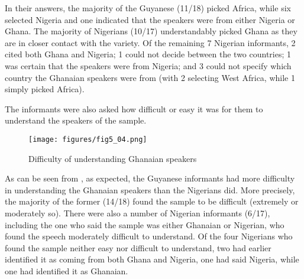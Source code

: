 \documentclass[output=paper,colorlinks,citecolor=brown]{langscibook}
\begin{document}
In their answers, the majority of the Guyanese (11/18) picked Africa, while six selected Nigeria and one indicated that the speakers were from either Nigeria or Ghana. The majority of Nigerians (10/17) understandably picked Ghana as they are in closer contact with the variety. Of the remaining 7 Nigerian informants, 2 cited both Ghana and Nigeria; 1 could not decide between the two countries; 1 was certain that the speakers were from Nigeria; and 3 could not specify which country the Ghanaian speakers were from (with 2 selecting West Africa, while 1 simply picked Africa).

The informants were also asked how difficult or easy it was for them to understand the speakers of the sample.

\begin{figure}
    \texttt{[image: figures/fig5\_04.png]}
    \caption{Difficulty of understanding Ghanaian speakers}
    \label{fig:fig5_04}
\end{figure}

As can be seen from , as expected, the Guyanese informants had more difficulty in understanding the Ghanaian speakers than the Nigerians did. More precisely, the majority of the former (14/18) found the sample to be difficult (extremely or moderately so). There were also a number of Nigerian informants (6/17), including the one who said the sample was either Ghanaian or Nigerian, who found the speech moderately difficult to understand. Of the four Nigerians who found the sample neither easy nor difficult to understand, two had earlier identified it as coming from both Ghana and Nigeria, one had said Nigeria, while one had identified it as Ghanaian.
\end{document}
